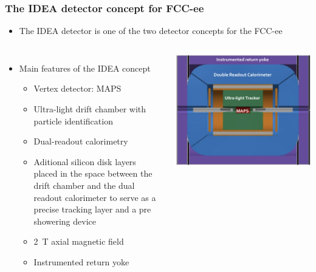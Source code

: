 \documentclass[aspectratio=169, hyperref={colorlinks=true,pdfpagelabels=false,linkcolor=black}, xcolor=dvipsnames,10pt]{beamer}
\begin{document}
\begin{frame}
  \frametitle{The IDEA detector concept for FCC-ee}

  \begin{itemize}
    \item The IDEA detector is one of the two detector concepts for the FCC-ee
  \end{itemize}

  \begin{columns}
      \begin{itemize}
        \item Main features of the IDEA concept
          \begin{itemize}
            \item Vertex detector: MAPS
            \item Ultra-light drift chamber with particle identification
            \item Dual-readout calorimetry
            \item Aditional silicon disk layers placed in the space between the drift chamber and the dual readout calorimeter to serve as a precise tracking layer and a pre showering device
            \item 2~T axial magnetic field
            \item Instrumented return yoke
          \end{itemize}
      \end{itemize}

      \centering
      \includegraphics[width=\textwidth]{./figures/FCCeeIDEAConcept}

  \end{columns}

\end{frame}
\end{document}
